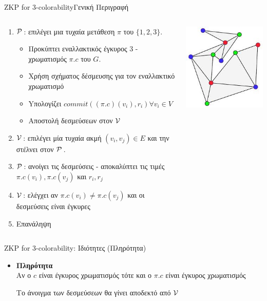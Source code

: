 \documentclass[10pt,handout]{beamer}
\begin{document}
\begin{frame}{ZKP for 3-colorability}{Γενική Περιγραφή}
\begin{columns}
\begin{small}
\begin{enumerate}
 	\setlength \itemsep{0.1em}
	\item $\mathcal{P}\,$: επιλέγει μια τυχαία μετάθεση $\pi$ του $\{ 1,2,3 \}$. \pause
	\begin{itemize}
		\item Προκύπτει εναλλακτικός έγκυρος 3 - χρωματισμός $\pi.c$ του $G$. \pause
		\item Χρήση σχήματος δέσμευσης για τον εναλλακτικό χρωματισμό
		\item Yπολογίζει $commit( (\pi.c)(v_i), r_i) \forall v_i \in V$ 
		\item Αποστολή δεσμεύσεων στον $\mathcal{V}\,$ \pause
	\end{itemize}
	\item $\mathcal{V}\,$: επιλέγει μία τυχαία ακμή $(v_i, v_j) \in E$ και την στέλνει στον $\mathcal{P}\,$. \pause
	\item $\mathcal{P}\,$: ανοίγει τις δεσμεύσεις - αποκαλύπτει τις τιμές $\pi.c(v_i),\pi.c(v_j)$ και $r_i, r_j$ \pause
	\item $\mathcal{V}\,$: ελέγχει αν $\pi.c(v_i) \neq \pi.c(v_j)$ και οι δεσμεύσεις είναι έγκυρες
	\item Επανάληψη
\end{enumerate}
\end{small}
\begin{center}
\includegraphics[scale=0.6]{3cp2.jpg}
\end{center}
\end{columns}
\end{frame}

 
\begin{frame}{ZKP for 3-colorability: Ιδιότητες (Πληρότητα)} 
\begin{itemize}
\item \textbf{Πληρότητα}\\
Αν ο $c$ είναι έγκυρος χρωματισμός τότε και ο $\pi.c$ είναι έγκυρος χρωματισμός

Το άνοιγμα των δεσμεύσεων θα γίνει αποδεκτό από $\mathcal{V}\,$
\end{itemize}
\end{frame}
\end{document}
